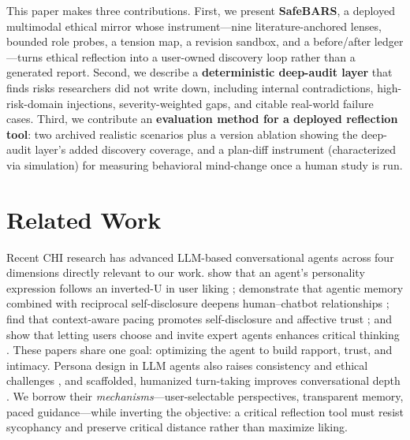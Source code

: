 \documentclass[sigconf,screen]{acmart}
\begin{document}
This paper makes three contributions. First, we present \textbf{SafeBARS}, a
deployed multimodal ethical mirror whose instrument---nine literature-anchored
lenses, bounded role probes, a tension map, a revision sandbox, and a
before/after ledger---turns ethical reflection into a user-owned discovery loop
rather than a generated report. Second, we describe a \textbf{deterministic
deep-audit layer} that finds risks researchers did not write down, including
internal contradictions, high-risk-domain injections, severity-weighted gaps,
and citable real-world failure cases. Third, we contribute an \textbf{evaluation
method for a deployed reflection tool}: two archived realistic scenarios plus a
version ablation showing the deep-audit layer's added discovery coverage, and a
plan-diff instrument (characterized via simulation) for measuring behavioral
mind-change once a human study is run.

\section{Related Work}

Recent CHI research has advanced LLM-based conversational agents across four
dimensions directly relevant to our work. \citeauthor{vibecheck26} show that an
agent's personality expression follows an inverted-U in user liking
\citep{vibecheck26}; \citeauthor{recallbot26} demonstrate that agentic memory
combined with reciprocal self-disclosure deepens human--chatbot relationships
\citep{recallbot26}; \citeauthor{hearinsilence26} find that context-aware pacing
promotes self-disclosure and affective trust \citep{hearinsilence26}; and
\citeauthor{perspectra26} show that letting users choose and invite expert
agents enhances critical thinking \citep{perspectra26}. These papers share one
goal: optimizing the agent to build rapport, trust, and intimacy. Persona design in LLM agents also raises consistency and ethical challenges \citep{sun2024persona}, and scaffolded, humanized turn-taking improves conversational depth \citep{liu2025scaffolded}. We borrow
their \emph{mechanisms}---user-selectable perspectives, transparent memory,
paced guidance---while inverting the objective: a critical reflection tool must
resist sycophancy and preserve critical distance rather than maximize liking.
\end{document}
